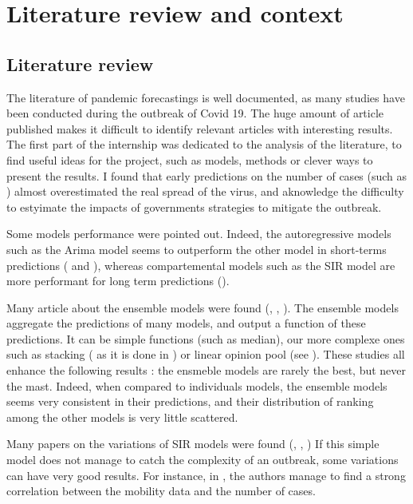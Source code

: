 \section{Literature review and context}

\subsection{Literature review}

The literature of pandemic forecastings is well documented, as many studies have been conducted during the outbreak of Covid 19. 
The huge amount of article published makes it difficult to identify relevant articles with interesting results. 
The first part of the internship was dedicated to the analysis of the literature, to find useful ideas for the project, such as models, methods or clever ways to present the results. 
I found that early predictions on the number of cases (such as \cite{gardner2020intervention}) almost overestimated the real spread of the virus, and aknowledge the difficulty to estyimate the impacts of governments strategies to mitigate the outbreak. 

Some models performance were pointed out. 
Indeed, the autoregressive models such as the Arima model seems to outperform the other model in short-terms predictions (\cite{kufel2020arima} and \cite{shang2021regional}), whereas compartemental models such as the SIR model are more performant for long term predictions (\cite{rahmandad2022enhancing}).

Many article about the ensemble models were found (\cite{cramer2022evaluation}, \cite{reich2019accuracy}, \cite{howerton2023evaluation}). 
The ensemble models aggregate the predictions of many models, and output a function of these predictions. 
It can be simple functions (such as median), our more complexe ones such as stacking ( as it is done in \cite{reich2019accuracy} ) or linear opinion pool (see \cite{howerton2023evaluation}).
These studies all enhance the following results : the ensmeble models are rarely the best, but never the mast. 
Indeed, when compared to individuals models, the ensemble models seems very consistent in their predictions, and their distribution of ranking among the other models is very little scattered. 

Many papers on the variations of SIR models were found (\cite{gerlee2021predicting}, \cite{hult2020estimates}, \cite{sjodin2020covid})
If this simple model does not manage to catch the complexity of an outbreak, some variations can have very good results. 
For instance, in \cite{gerlee2021predicting}, the authors manage to find a strong correlation between the mobility data and the number of cases. 

